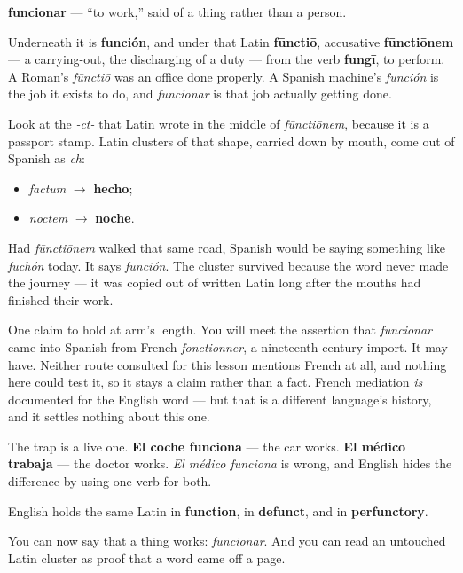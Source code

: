 \begin{cousinweb}
\textbf{funcionar} — \textquotedblleft{}to work,\textquotedblright{} said of a thing rather than a person.

Underneath it is \textbf{función}, and under that Latin \textbf{fūnctiō}, accusative \textbf{fūnctiōnem} — a carrying-out, the discharging of a duty — from the verb \textbf{fungī}, to perform. A Roman's \emph{fūnctiō} was an office done properly. A Spanish machine's \emph{función} is the job it exists to do, and \emph{funcionar} is that job actually getting done.

Look at the \emph{-ct-} that Latin wrote in the middle of \emph{fūnctiōnem}, because it is a passport stamp. Latin clusters of that shape, carried down by mouth, come out of Spanish as \emph{ch}:

\begin{itemize}
\raggedright
  \item \emph{factum} $\to$ \textbf{hecho};
  \item \emph{noctem} $\to$ \textbf{noche}.
\end{itemize}

Had \emph{fūnctiōnem} walked that same road, Spanish would be saying something like \emph{fuchón} today. It says \emph{función}. The cluster survived because the word never made the journey — it was copied out of written Latin long after the mouths had finished their work.

One claim to hold at arm's length. You will meet the assertion that \emph{funcionar} came into Spanish from French \emph{fonctionner}, a nineteenth-century import. It may have. Neither route consulted for this lesson mentions French at all, and nothing here could test it, so it stays a claim rather than a fact. French mediation \emph{is} documented for the English word — but that is a different language's history, and it settles nothing about this one.

The trap is a live one. \textbf{El coche funciona} — the car works. \textbf{El médico trabaja} — the doctor works. \emph{El médico funciona} is wrong, and English hides the difference by using one verb for both.

English holds the same Latin in \textbf{function}, in \textbf{defunct}, and in \textbf{perfunctory}.
\end{cousinweb}

\begin{grammarlens}[title={What you've built}]
You can now say that a thing works: \emph{funcionar}. And you can read an untouched Latin cluster as proof that a word came off a page.
\end{grammarlens}

